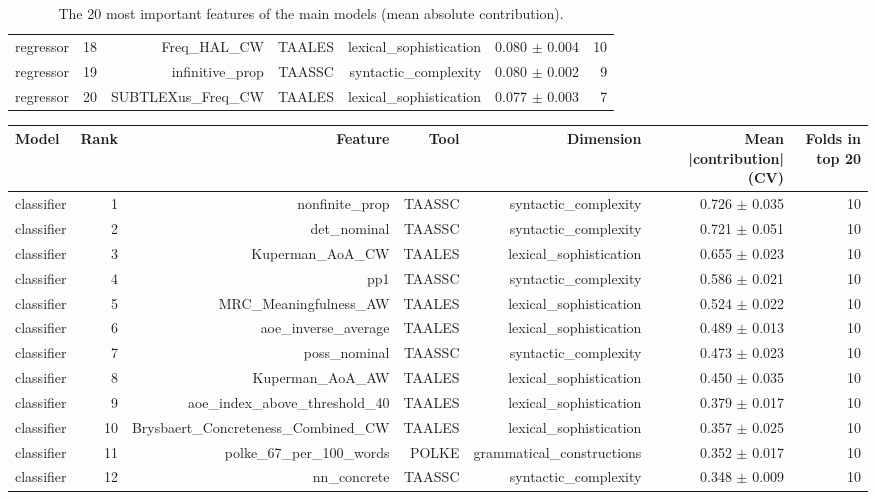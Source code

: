 \begin{table}[t]
\begin{tabular}{lrrrrrr}
regressor & 18 & Freq\_HAL\_CW & TAALES & lexical\_sophistication & 0.080 $\pm$ 0.004 & 10 \\
regressor & 19 & infinitive\_prop & TAASSC & syntactic\_complexity & 0.080 $\pm$ 0.002 & 9 \\
regressor & 20 & SUBTLEXus\_Freq\_CW & TAALES & lexical\_sophistication & 0.077 $\pm$ 0.003 & 7 \\
\bottomrule
\end{tabular}
\caption{The 20 most important features of the main models (mean absolute contribution).}
\label{tab:table_7_top_features}
\end{table}

\begin{table}[t]
\centering
\small
\begin{tabular}{lrrrrrr}
\toprule
Model & Rank & Feature & Tool & Dimension & Mean |contribution| (CV) & Folds in top 20 \\
\midrule
classifier & 1 & nonfinite\_prop & TAASSC & syntactic\_complexity & 0.726 $\pm$ 0.035 & 10 \\
classifier & 2 & det\_nominal & TAASSC & syntactic\_complexity & 0.721 $\pm$ 0.051 & 10 \\
classifier & 3 & Kuperman\_AoA\_CW & TAALES & lexical\_sophistication & 0.655 $\pm$ 0.023 & 10 \\
classifier & 4 & pp1 & TAASSC & syntactic\_complexity & 0.586 $\pm$ 0.021 & 10 \\
classifier & 5 & MRC\_Meaningfulness\_AW & TAALES & lexical\_sophistication & 0.524 $\pm$ 0.022 & 10 \\
classifier & 6 & aoe\_inverse\_average & TAALES & lexical\_sophistication & 0.489 $\pm$ 0.013 & 10 \\
classifier & 7 & poss\_nominal & TAASSC & syntactic\_complexity & 0.473 $\pm$ 0.023 & 10 \\
classifier & 8 & Kuperman\_AoA\_AW & TAALES & lexical\_sophistication & 0.450 $\pm$ 0.035 & 10 \\
classifier & 9 & aoe\_index\_above\_threshold\_40 & TAALES & lexical\_sophistication & 0.379 $\pm$ 0.017 & 10 \\
classifier & 10 & Brysbaert\_Concreteness\_Combined\_CW & TAALES & lexical\_sophistication & 0.357 $\pm$ 0.025 & 10 \\
classifier & 11 & polke\_67\_per\_100\_words & POLKE & grammatical\_constructions & 0.352 $\pm$ 0.017 & 10 \\
classifier & 12 & nn\_concrete & TAASSC & syntactic\_complexity & 0.348 $\pm$ 0.009 & 10 \\

\end{tabular}
\end{table}
